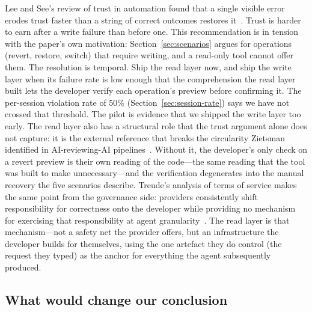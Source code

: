 Lee and See's review of trust in automation found that a single visible error
erodes trust faster than a string of correct outcomes restores
it~\cite{lee2004}. Trust is harder to earn after a write failure than before
one. This recommendation is in tension with the
paper's own motivation: Section~\ref{sec:scenarios} argues for operations
(revert, restore, switch) that require writing, and a read-only tool cannot
offer them. The resolution is temporal. Ship the read layer now, and ship the
write layer when its failure rate is low enough that the comprehension the read
layer built lets the developer verify each operation's preview before
confirming it. The per-session violation rate of 50\%
(Section~\ref{sec:session-rate}) says we have not crossed that threshold. The
pilot is evidence that we shipped the write layer too early. The read layer also
has a structural role that the trust argument alone does not capture: it is the
external reference that breaks the circularity Zietsman identified in
AI-reviewing-AI pipelines~\cite{zietsman2026}. Without it, the developer's only
check on a revert preview is their own reading of the code---the same reading
that the tool was built to make unnecessary---and the verification degenerates
into the manual recovery the five scenarios describe. Treude's analysis of terms
of service makes the same point from the governance side: providers consistently
shift responsibility for correctness onto the developer while providing no
mechanism for exercising that responsibility at agent
granularity~\cite{treude2026accountable}. The read layer is that mechanism---not
a safety net the provider offers, but an infrastructure the developer builds
for themselves, using the one artefact they do control (the request they typed) as
the anchor for everything the agent subsequently produced.

\subsection{What would change our conclusion}

